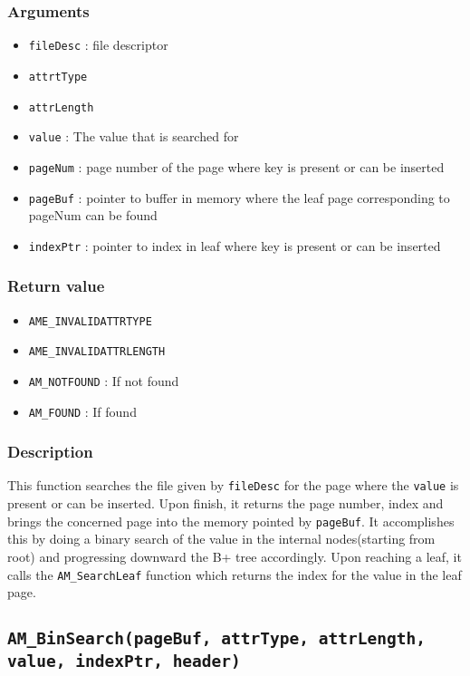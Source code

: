 \documentclass[a4paper, 12pt]{article}
\begin{document}
\subsubsection{Arguments}
\begin{itemize}
	\item{\texttt{fileDesc} : file descriptor}
	\item{\texttt{attrtType}}
	\item{\texttt{attrLength}}
	\item{\texttt{value} : The value that is searched for}
	\item{\texttt{pageNum} : page number of the page where key is present or can be inserted}
	\item{\texttt{pageBuf} : pointer to buffer in memory where the leaf page corresponding to pageNum can be found}
	\item{\texttt{indexPtr} : pointer to index in leaf where key is present or can be inserted}
\end{itemize}
\subsubsection{Return value}
\begin{itemize}
	\item{\texttt{AME\_INVALIDATTRTYPE}}
	\item{\texttt{AME\_INVALIDATTRLENGTH}}
	\item{\texttt{AM\_NOTFOUND} : If not found}
	\item{\texttt{AM\_FOUND} : If found}
\end{itemize}
\subsubsection{Description}
This function searches the file given by \texttt{fileDesc} for the page where the \texttt{value} is present or can be inserted. Upon finish, it returns the page number, index and brings the concerned page into the memory pointed by \texttt{pageBuf}. It accomplishes this by doing a binary search of the value in the internal nodes(starting from root) and progressing downward the B+ tree accordingly. Upon reaching a leaf, it calls the \texttt{AM\_SearchLeaf} function which returns the index for the value in the leaf page.


\subsection{\texttt{AM\_BinSearch(pageBuf, attrType, attrLength, value, indexPtr, header)}}
\end{document}
